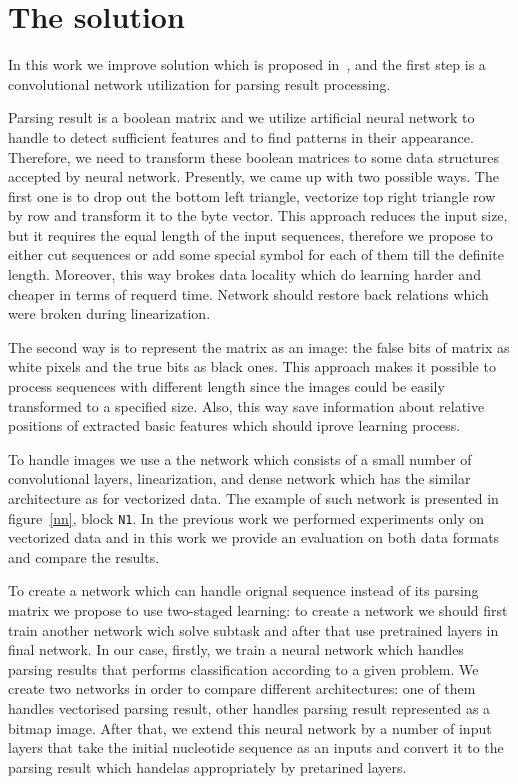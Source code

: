 \documentclass[12pt,a4paper]{cibb}
\begin{document}
\section{\bf The solution}

In this work we improve solution which is proposed in~\cite{grigorevcomposition}, and the first step is a convolutional network utilization for parsing result processing.

Parsing result is a boolean matrix and we utilize artificial neural network to handle to detect sufficient features and to find patterns in their appearance.
Therefore, we need to transform these boolean matrices to some data structures accepted by neural network.
Presently, we came up with two possible ways.
The first one is to drop out the bottom left triangle, vectorize top right triangle row by row and transform it to the byte vector.
This approach reduces the input size, but it requires the equal length of the input sequences, therefore we propose to either cut sequences or add some special symbol for each of them till the definite length.
Moreover, this way brokes data locality which do learning harder and cheaper in terms of requerd time.
Network should restore back relations which were broken during linearization.

The second way is to represent the matrix as an image: the false bits of matrix as white pixels and the true bits as black ones.
This approach makes it possible to process sequences with different length since the images could be easily transformed to a specified size.
Also, this way save information about relative positions of extracted basic features which should iprove learning process.

To handle images we use a the network which consists of a small number of convolutional layers, linearization, and dense network which has the similar architecture as for vectorized data.
The example of such network is presented in figure~\ref{nn}, block \texttt{N1}.
In the previous work we performed experiments only on vectorized data and in this work we provide an evaluation on both data formats and compare the results.

To create a network which can handle orignal sequence instead of its parsing matrix we propose to use two-staged learning: to create a network we should first train another network wich solve subtask and after that use pretrained layers in final network.
In our case, firstly, we train a neural network which handles parsing results that performs classification according to a given problem.
We create two networks in order to compare different architectures: one of them handles vectorised parsing result, other handles parsing result represented as a bitmap image.
After that, we extend this neural network by a number of input layers that take the initial nucleotide sequence as an inputs and convert it to the parsing result which handelas appropriately by pretarined layers.
\end{document}
